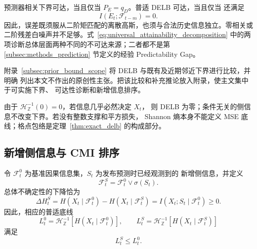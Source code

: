 预测器相关下界可达，当且仅当 \(P_E=q_D\)。普适 DELB 可达，当且仅当
还满足
\begin{equation}
I(E_t;\mathcal F_{t-m})=0.
\label{eq:general_innovation_independence}
\end{equation}
因此，误差既须服从二阶矩匹配的离散高斯，也须与合法历史信息独立。零相关或
二阶残差白噪声并不足够。式~\eqref{eq:universal_attainability_decomposition}
中的两项诊断总体层面两种不同的不可达来源；二者都不是第
\ref{subsec:methods_prediction} 节定义的经验 Predictability Gap。

附录~\ref{subsec:prior_bound_scope} 将 DELB 与既有及近期邻近下界进行比较，并明确
列出本文不作出的原创性主张。把该比较和补充推论放入附录，使主文集中于可实施下界、
可达性诊断和新增信息排序。

\begin{Remark}[边界与损失条件]
\label{rem:general_boundary_cases}
由于 \(\mathcal H_{\mathbb Z}^{-1}(0)=0\)，若信息几乎必然决定 \(X_t\)，
则 DELB 为零；条件无关的侧信息不改变下界。若没有整数支撑和平方损失，
Shannon 熵本身不能定义 MSE 底线；格点包络是定理~\ref{thm:exact_delb}
的构成部分。
\label{rem:support_and_loss}
\end{Remark}

\subsection{新增侧信息与 CMI 排序}
\label{subsec:side_information}

令 \(\mathcal F_t^0\) 为基准因果信息集，\(S_t\) 为发布预测时已经观测到的
新增侧信息，并定义
\begin{equation}
\mathcal F_t^S=\mathcal F_t^0\vee\sigma(S_t).
\label{eq:generic_augmented_information}
\end{equation}
总体不确定性的下降恰为
\begin{equation}
\Delta H^S_t
=
H(X_t\mid\mathcal F_t^0)-H(X_t\mid\mathcal F_t^S)
=
I(X_t;S_t\mid\mathcal F_t^0)\geq0.
\label{eq:generic_information_gain}
\end{equation}
因此，相应的普适底线
\begin{equation}
L_t^0=\mathcal H_{\mathbb Z}^{-1}
\!\left[H(X_t\mid\mathcal F_t^0)\right],
\qquad
L_t^S=\mathcal H_{\mathbb Z}^{-1}
\!\left[H(X_t\mid\mathcal F_t^S)\right]
\label{eq:generic_side_information_bounds}
\end{equation}
满足
\begin{equation}
L_t^S\leq L_t^0.
\label{eq:generic_side_information_ordering}
\end{equation}

